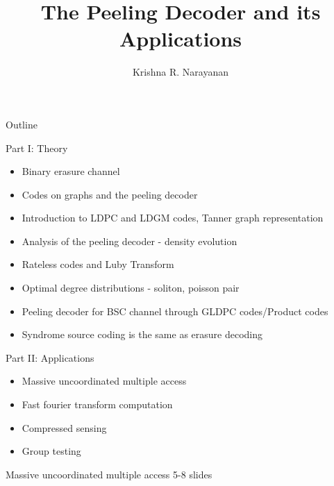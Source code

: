 \documentclass[10pt,xcolor=table]{beamer}
\begin{document}
	\title{The Peeling Decoder and its Applications}
	\author{ Krishna R. Narayanan
	}
	\date{}
	\frame{\titlepage}
	\begin{frame}{Outline}
	\begin{block}{Part I: Theory}
	\begin{itemize}
	  \item Binary erasure channel
	  \item Codes on graphs and the peeling decoder
	  \item Introduction to LDPC and LDGM codes, Tanner graph representation
	  \item Analysis of the peeling decoder - density evolution
	  \item Rateless codes and Luby Transform
	  \item Optimal degree distributions - soliton, poisson pair
	  \item Peeling decoder for BSC channel through GLDPC codes/Product codes
	  \item Syndrome source coding is the same as erasure decoding
	\end{itemize}
	\end{block}
	
	\begin{block}{Part II: Applications}
	\begin{itemize}
	  \item Massive uncoordinated multiple access
	  \item Fast fourier transform computation
	  \item Compressed sensing
	  \item Group testing
	\end{itemize}
	\end{block}
	\end{frame}
	\begin{frame}{Massive uncoordinated multiple access}
	5-8 slides
	\end{frame}
\end{document}
